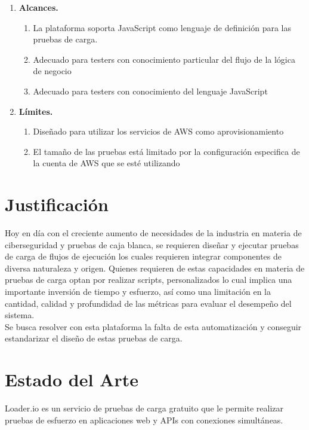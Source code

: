 \documentclass[10pt]{article}
\begin{document}
\begin{enumerate}
\item \textbf{Alcances.}

\begin{enumerate}
\item La plataforma soporta JavaScript como lenguaje de definición para las pruebas
de carga.
\item Adecuado para testers con conocimiento particular del flujo de la lógica de
negocio
\item Adecuado para testers con conocimiento del lenguaje JavaScript \end {enumerate}

\item  \textbf{Límites.}

\begin{enumerate}
    \item Diseñado para utilizar los servicios de AWS como aprovisionamiento
    \item El tamaño de las pruebas está limitado por la configuración especifica de la
          cuenta de AWS que se esté utilizando \end {enumerate}
\end{enumerate}


\section{Justificación}
\justify
Hoy en día con el creciente aumento de necesidades de la industria en materia de ciberseguridad y pruebas de caja blanca, se requieren diseñar y ejecutar pruebas de carga de flujos de ejecución los cuales requieren integrar componentes de diversa naturaleza y origen. Quienes requieren de estas capacidades en materia de pruebas de carga optan por realizar scripts,  personalizados lo cual implica una importante inversión de tiempo y esfuerzo,  así como una limitación en la cantidad, calidad y profundidad de las métricas para evaluar el desempeño del sistema.
\\Se busca resolver con esta plataforma la falta de esta automatización y conseguir estandarizar el diseño de estas pruebas de carga.
\section{Estado del Arte}
\justify
\cite{IEEEreferencias:Ref1} Loader.io  es un servicio de pruebas de carga gratuito que le permite realizar pruebas de esfuerzo en aplicaciones web y APIs con conexiones simultáneas.
\end{document}
